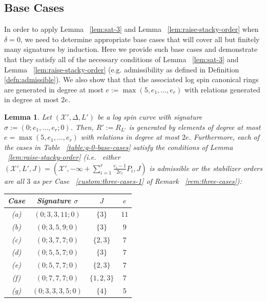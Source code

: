 \documentclass{amsart}
\theoremstyle{plain}
\newtheorem{lem}[thm]{Lemma}
\theoremstyle{definition}
\theoremstyle{remark}
\numberwithin{equation}{section}
\newcommand\ssec{\subsection}
\newcommand\sx{\mathscr X}
\newcommand \subhalf[1]{\frac{{#1} - 1}{2{#1}}}
\newcommand{\halfcan}{L}
\begin{document}
\ssec{Base Cases}
\label{ssec:g-0-base}
In order to apply Lemma ~\ref{lem:sat-3} and Lemma
~\ref{lem:raise-stacky-order} when $\delta = 0$,
we need to determine appropriate base cases that will
cover all but finitely many signatures by induction.
Here we provide such base cases and demonstrate that
they satisfy all of the necessary conditions of
Lemma ~\ref{lem:sat-3} and Lemma ~\ref{lem:raise-stacky-order}
(e.g. admissibility as defined in Definition \ref{defn:admissible}).
We also show that that the associated log spin
canonical rings are generated in degree at most $e := \max(5, e_1,
\ldots, e_r)$ with relations generated in degree at most $2e$.

\begin{lem}
\label{lem:g-0-admissible-cases}
Let $(\sx', \Delta, \halfcan')$ be a log spin curve with signature
$\sigma := (0; e_1, \ldots, e_r; 0)$. Then, $R' := R_{\halfcan'}$ is
generated by elements of degree at most $e = \max(5 , e_1, \ldots,
e_r)$ with relations in degree at most $2e$. Furthermore, each of
the cases in Table ~\ref{table:g-0-base-cases} satisfy the
conditions of Lemma ~\ref{lem:raise-stacky-order} (i.e.~ either $(\sx',
\halfcan', J) = (\sx', -\infty + \sum_{i = 1}^{r} \subhalf{e_i}
P_i, J)$ is admissible or the stabilizer orders are all $3$ as per
Case ~\ref{custom:three-cases-1} of Remark ~\ref{rem:three-cases}):
 
\rm{
\begin{table}
\begin{tabular}
	{| c || c | c | c |}
	\hline
	Case & Signature $\sigma$ & $J$ & $e$\\
	\hline
	\hline

	(a) & $(0; 3, 3, 11; 0)$ & $\{3\}$ & $11$ \\	\hline

	(b) & $(0; 3, 5, 9; 0)$ & $\{3\}$	& $9$ \\ \hline

	(c) & $(0; 3, 7, 7; 0)$ & $\{2, 3\}$ & $7$ \\ \hline

	(d) & $(0; 5, 5, 7; 0)$ & $\{3\}$	& $7$ \\ \hline
	
	(e) & $(0; 5, 7, 7; 0)$ & $\{2, 3\}$ & $7$ \\ \hline
	
	(f) & $(0; 7, 7, 7; 0)$ & $\{1, 2, 3\}$	& $7$ \\ \hline

	(g) & $(0; 3, 3, 3, 5; 0)$ & $\{4\}$ & $5$ \\ \hline
	

\end{tabular}
\end{table}}
\end{lem}
\end{document}
